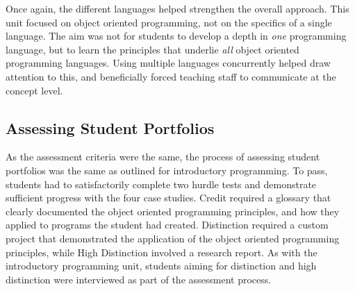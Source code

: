 Once again, the different languages helped strengthen the overall approach. This unit focused on object oriented programming, not on the specifics of a single language. The aim was not for students to develop a depth in \emph{one} programming language, but to learn the principles that underlie \emph{all} object oriented programming languages. Using multiple languages concurrently helped draw attention to this, and beneficially forced teaching staff to communicate at the concept level. 



\subsection{Assessing Student Portfolios} %
\label{sub:oop_assessing_student_portfolios}

As the assessment criteria were the same, the process of assessing student portfolios was the same as outlined for introductory programming. To pass, students had to satisfactorily complete two hurdle tests and demonstrate sufficient progress with the four case studies. Credit required a glossary that clearly documented the object oriented programming principles, and how they applied to programs the student had created. Distinction required a custom project that demonstrated the application of the object oriented programming principles, while High Distinction involved a research report. As with the introductory programming unit, students aiming for distinction and high distinction were interviewed as part of the assessment process.




